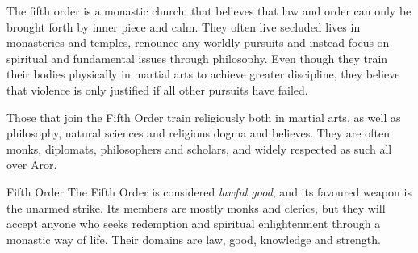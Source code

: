 The fifth order is a monastic church, that believes that law and order can only
be brought forth by inner piece and calm. They often live secluded lives in
monasteries and temples, renounce any worldly pursuits and instead focus on
spiritual and fundamental issues through philosophy. Even though they train
their bodies physically in martial arts to achieve greater discipline, they
believe that violence is only justified if all other pursuits have failed.

Those that join the Fifth Order train religiously both in martial arts, as well
as philosophy, natural sciences and religious dogma and believes. They are often
monks, diplomats, philosophers and scholars, and widely respected as such all
over Aror.

\begin{35e}{Fifth Order}
  The Fifth Order is considered \emph{lawful good}, and its favoured weapon is
  the unarmed strike. Its members are mostly monks and clerics, but they will
  accept anyone who seeks redemption and spiritual enlightenment through a
  monastic way of life. Their domains are law, good, knowledge and strength.
\end{35e}
